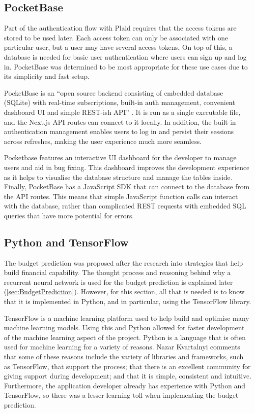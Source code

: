 \subsection{PocketBase}
Part of the authentication flow with Plaid requires that the access tokens are stored to be used later. Each access token can only be associated with one particular user, but a user may have several access tokens. On top of this, a database is needed for basic user authentication where users can sign up and log in. PocketBase was determined to be most appropriate for these use cases due to its simplicity and fast setup.

PocketBase is an ``open source backend consisting of embedded database (SQLite) with real-time subscriptions, built-in auth management, convenient dashboard UI and simple REST-ish API'' \cite{PocketBaseDocs}. It is run as a single executable file, and the Next.js API routes can connect to it locally. In addition, the built-in authentication management enables users to log in and persist their sessions across refreshes, making the user experience much more seamless.

Pocketbase features an interactive UI dashboard for the developer to manage users and aid in bug fixing. This dashboard improves the development experience as it helps to visualise the database structure and manage the tables inside. Finally, PocketBase has a JavaScript SDK that can connect to the database from the API routes. This means that simple JavaScript function calls can interact with the database, rather than complicated REST requests with embedded SQL queries that have more potential for errors.

\subsection{Python and TensorFlow}
The budget prediction was proposed after the research into strategies that help build financial capability. The thought process and reasoning behind why a recurrent neural network is used for the budget prediction is explained later (\ref{sec:BudgetPrediction}). However, for this section, all that is needed is to know that it is implemented in Python, and in particular, using the TensorFlow library.

TensorFlow is a machine learning platform used to help build and optimise many machine learning models. Using this and Python allowed for faster development of the machine learning aspect of the project. Python is a language that is often used for machine learning for a variety of reasons. Nazar Kvartalnyi \cite{PythonML} comments that some of these reasons include the variety of libraries and frameworks, such as TensorFlow, that support the process; that there is an excellent community for giving support during development; and that it is simple, consistent and intuitive. Furthermore, the application developer already has experience with Python and TensorFlow, so there was a lesser learning toll when implementing the budget prediction.

